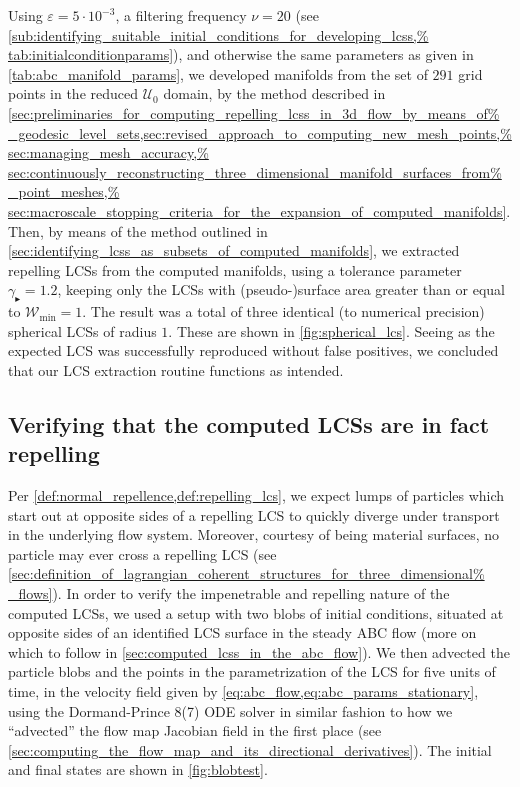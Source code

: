 

Using $\varepsilon=5\cdot10^{-3}$, a filtering frequency $\nu=20$ (see
\cref{sub:identifying_suitable_initial_conditions_for_developing_lcss,%
tab:initialconditionparams}), and otherwise the same parameters as given
in \cref{tab:abc_manifold_params}, we developed manifolds from the set
of $291$ grid points in the reduced $\mathcal{U}_{0}$ domain, by the method
described in
\cref{sec:preliminaries_for_computing_repelling_lcss_in_3d_flow_by_means_of%
    _geodesic_level_sets,sec:revised_approach_to_computing_new_mesh_points,%
    sec:managing_mesh_accuracy,%
    sec:continuously_reconstructing_three_dimensional_manifold_surfaces_from%
    _point_meshes,%
    sec:macroscale_stopping_criteria_for_the_expansion_of_computed_manifolds}.
Then, by means of the method outlined in
\cref{sec:identifying_lcss_as_subsets_of_computed_manifolds}, we extracted
repelling LCSs from the computed manifolds, using a tolerance parameter
$\gamma_{\blacktriangleright}=1.2$, keeping only the LCSs with (pseudo-)surface
area greater than or equal to $\mathcal{W}_{\min}=1$. The result was a total of
three identical (to numerical precision) spherical LCSs of radius $1$. These
are shown in \cref{fig:spherical_lcs}. Seeing as the expected LCS was
successfully reproduced without false positives, we concluded that our LCS
extraction routine functions as intended.




\subsection{Verifying that the computed LCSs are in fact repelling}
\label{sub:verifying_that_the_computed_lcss_are_in_fact_repelling}

Per \cref{def:normal_repellence,def:repelling_lcs}, we expect lumps of
particles which start out at opposite sides of a repelling LCS to quickly
diverge under transport in the underlying flow system. Moreover, courtesy
of being material surfaces, no particle may ever cross a repelling LCS (see
\cref{sec:definition_of_lagrangian_coherent_structures_for_three_dimensional%
_flows}). In order to verify the impenetrable and repelling nature of the
computed LCSs, we used a setup with two blobs of initial conditions, situated
at opposite sides of an identified LCS surface in the steady ABC flow (more on
which to follow in \cref{sec:computed_lcss_in_the_abc_flow}). We then advected
the particle blobs and the points in the parametrization of the LCS for five
units of time, in the velocity field given by
\cref{eq:abc_flow,eq:abc_params_stationary}, using the Dormand-Prince 8(7) ODE
solver in similar fashion to how we ``advected'' the flow map Jacobian field in
the first place (see
\cref{sec:computing_the_flow_map_and_its_directional_derivatives}). The initial
and final states are shown in \cref{fig:blobtest}.

